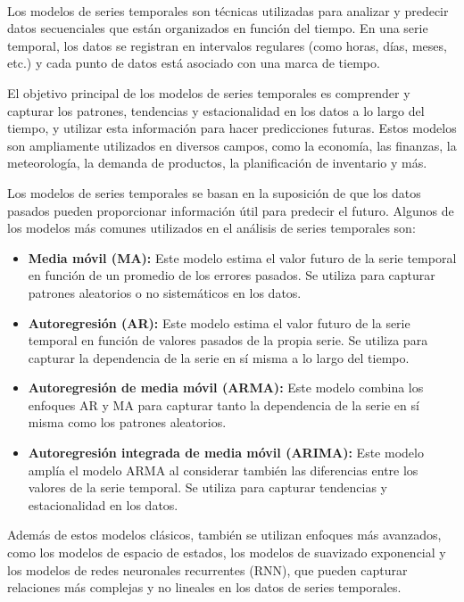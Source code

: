 \\
Los modelos de series temporales son técnicas utilizadas para analizar y predecir datos secuenciales que están organizados en función del tiempo. En una serie temporal, los datos se registran en intervalos regulares (como horas, días, meses, etc.) y cada punto de datos está asociado con una marca de tiempo.

El objetivo principal de los modelos de series temporales es comprender y capturar los patrones, tendencias y estacionalidad en los datos a lo largo del tiempo, y utilizar esta información para hacer predicciones futuras. Estos modelos son ampliamente utilizados en diversos campos, como la economía, las finanzas, la meteorología, la demanda de productos, la planificación de inventario y más.

Los modelos de series temporales se basan en la suposición de que los datos pasados pueden proporcionar información útil para predecir el futuro. Algunos de los modelos más comunes utilizados en el análisis de series temporales son:
\begin{itemize}
    \item \textbf{Media móvil (MA):} Este modelo estima el valor futuro de la serie temporal en función de un promedio de los errores pasados. Se utiliza para capturar patrones aleatorios o no sistemáticos en los datos.
    \item \textbf{Autoregresión (AR):} Este modelo estima el valor futuro de la serie temporal en función de valores pasados de la propia serie. Se utiliza para capturar la dependencia de la serie en sí misma a lo largo del tiempo.
    \item \textbf{Autoregresión de media móvil (ARMA):} Este modelo combina los enfoques AR y MA para capturar tanto la dependencia de la serie en sí misma como los patrones aleatorios.
    \item \textbf{Autoregresión integrada de media móvil (ARIMA):} Este modelo amplía el modelo ARMA al considerar también las diferencias entre los valores de la serie temporal. Se utiliza para capturar tendencias y estacionalidad en los datos.
\end{itemize}

Además de estos modelos clásicos, también se utilizan enfoques más avanzados, como los modelos de espacio de estados, los modelos de suavizado exponencial y los modelos de redes neuronales recurrentes (RNN), que pueden capturar relaciones más complejas y no lineales en los datos de series temporales.

